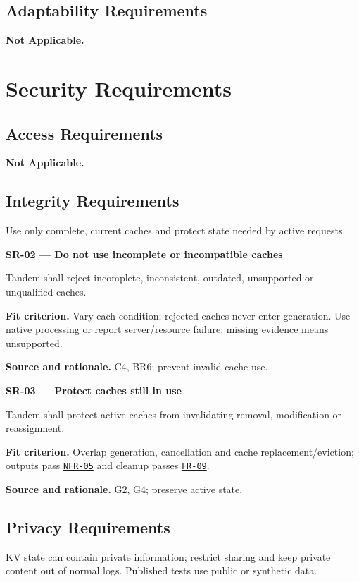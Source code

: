 \documentclass[12pt]{article}
\begin{document}
\subsection{Adaptability Requirements}
\textbf{Not Applicable.}


\section{Security Requirements}

\subsection{Access Requirements}
\label{sec:security}
\textbf{Not Applicable.}

\subsection{Integrity Requirements}
Use only complete, current caches and protect state needed by active requests.

\par\medskip\noindent{}\label{req:SR-02}
\textbf{SR-02 --- Do not use incomplete or incompatible caches}\par
Tandem shall reject incomplete, inconsistent, outdated, unsupported or unqualified caches.\par
\textbf{Fit criterion.} Vary each condition; rejected caches never enter generation. Use native processing or report server/resource failure; missing evidence means unsupported.\par
\textbf{Source and rationale.} C4, BR6; prevent invalid cache use.

\par\medskip\noindent{}\label{req:SR-03}
\textbf{SR-03 --- Protect caches still in use}\par
Tandem shall protect active caches from invalidating removal, modification or reassignment.\par
\textbf{Fit criterion.} Overlap generation, cancellation and cache replacement/eviction; outputs pass \hyperref[req:NFR-05]{\texttt{NFR-05}} and cleanup passes \hyperref[req:FR-09]{\texttt{FR-09}}.\par
\textbf{Source and rationale.} G2, G4; preserve active state.

\subsection{Privacy Requirements}
KV state can contain private information; restrict sharing and keep private
content out of normal logs. Published tests use public or synthetic data.
\end{document}
